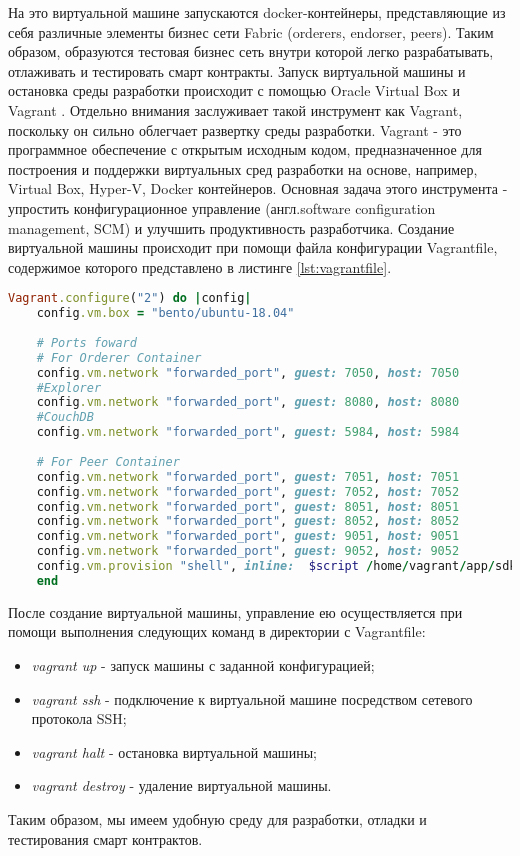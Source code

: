 На это виртуальной машине запускаются docker-контейнеры, представляющие из себя различные элементы бизнес сети Fabric (orderers, endorser, peers). Таким образом, образуются тестовая бизнес сеть внутри которой легко разрабатывать, отлаживать и тестировать смарт контракты. Запуск виртуальной машины и остановка среды разработки происходит с помощью Oracle Virtual Box \cite{oracle-vbox-site} и Vagrant \cite{vagrant-site}.
Отдельно внимания заслуживает такой инструмент как Vagrant, поскольку он сильно облегчает развертку среды разработки. 
Vagrant - это программное обеспечение с открытым исходным кодом, предназначенное для построения и поддержки виртуальных сред разработки на основе, например, Virtual Box, Hyper-V, Docker контейнеров. Основная задача этого инструмента - упростить конфигурационное управление (англ.software configuration management, SCM) \cite{scm} и улучшить продуктивность разработчика. 
Создание виртуальной машины происходит при помощи файла конфигурации Vagrantfile, содержимое которого представлено в листинге \ref{lst:vagrantfile}.

\begin{lstlisting}[caption={Конфигурация виртуальной машины: Vagrantfile},label={lst:vagrantfile},language=Ruby]
	Vagrant.configure("2") do |config|
	config.vm.box = "bento/ubuntu-18.04"
	
	# Ports foward
	# For Orderer Container
	config.vm.network "forwarded_port", guest: 7050, host: 7050
	#Explorer
	config.vm.network "forwarded_port", guest: 8080, host: 8080
	#CouchDB
	config.vm.network "forwarded_port", guest: 5984, host: 5984
	
	# For Peer Container
	config.vm.network "forwarded_port", guest: 7051, host: 7051
	config.vm.network "forwarded_port", guest: 7052, host: 7052
	config.vm.network "forwarded_port", guest: 8051, host: 8051
	config.vm.network "forwarded_port", guest: 8052, host: 8052
	config.vm.network "forwarded_port", guest: 9051, host: 9051
	config.vm.network "forwarded_port", guest: 9052, host: 9052
	config.vm.provision "shell", inline:  $script /home/vagrant/app/sdk/vagrant_node_modules
	end
\end{lstlisting}


После создание виртуальной машины, управление ею осуществляется при помощи выполнения следующих команд в директории с Vagrantfile:
\begin{itemize}
	\item \textit{vagrant up} - запуск машины с заданной конфигурацией;
	\item \textit{vagrant ssh} - подключение к виртуальной машине посредством сетевого протокола SSH;
	\item \textit{vagrant halt} - остановка виртуальной машины;
	\item \textit{vagrant destroy} - удаление виртуальной машины.
\end{itemize}
Таким образом, мы имеем удобную среду для разработки, отладки и тестирования смарт контрактов.

